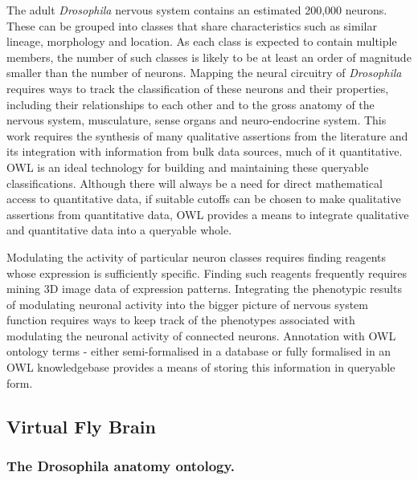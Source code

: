\documentclass[runningheads,a4paper]{llncs}
\begin{document}
The adult \textit{Drosophila} nervous system contains an estimated
200,000 neurons.  These can be grouped into classes that share characteristics such as
similar lineage, morphology and location.  As each class is expected to contain multiple
members, the number of such classes
is likely to be at least an order of magnitude smaller than the number
of neurons.  Mapping the neural circuitry of \textit{Drosophila}
requires ways to track the classification of these neurons and their
properties, including their relationships to each other and to the
gross anatomy of the nervous system, musculature, sense organs and
neuro-endocrine system.  This work requires the synthesis of many
qualitative assertions from the literature and its integration with
information from bulk data sources, much of it quantitative.  OWL
is an ideal technology for building and maintaining these queryable
classifications. Although there will always be a need for direct mathematical
access to quantitative data, if suitable cutoffs can be
chosen to make qualitative assertions from quantitative data, OWL
provides a means to integrate qualitative and quantitative data into a
queryable whole.

Modulating the activity of particular neuron classes requires finding
reagents whose expression is sufficiently specific. Finding such reagents
frequently requires mining 3D image data of expression patterns.
Integrating the phenotypic results of modulating neuronal activity
into the bigger picture of nervous system function requires ways to
keep track of the phenotypes associated with modulating the neuronal
activity of connected neurons.  Annotation with OWL ontology terms -
either semi-formalised in a database or fully formalised in an OWL
knowledgebase provides a means of storing this information in
queryable form.

\subsection{Virtual Fly Brain}

\subsubsection{The Drosophila anatomy ontology.}
\end{document}
